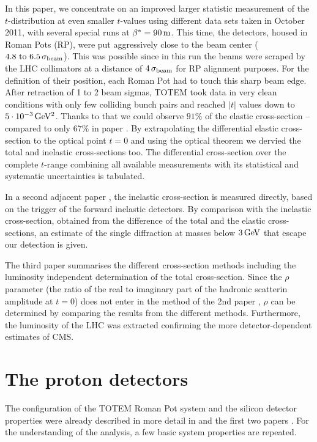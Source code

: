 \documentclass[doublecol]{../macros/epl2}
\def\un#1{\,{\rm #1}}
\begin{document}
In this paper, we concentrate on an improved larger statistic measurement of the $t$-distribution at even smaller $t$-values using different data sets taken in October 2011, with several special runs at $\beta^* = 90\un{m}$. This time, the detectors, housed in Roman Pots (RP), were put aggressively close to the beam center ($4.8 \hbox{ to } 6.5\, \sigma_{\rm beam}$). This was possible since in this run the beams were scraped by the LHC collimators at a distance of $4\,\sigma_{\rm beam}$ for RP alignment purposes. For the definition of their position, each Roman Pot had to touch this sharp beam edge. After retraction of 1 to 2 beam sigmas, TOTEM took data in very clean conditions with only few colliding bunch pairs and reached $|t|$ values down to $5\cdot10^{-3}\un{GeV^2}$. Thanks to that we could observe $91\%$ of the elastic cross-section -- compared to only $67\%$ in paper \cite{epl96}. By extrapolating the differential elastic cross-section to the optical point $t=0$ and using the optical theorem we dervied the total and inelastic cross-sections too. The differential cross-section over the complete $t$-range combining all available measurements with its statistical and systematic uncertainties is tabulated.

In a second adjacent paper \cite{P2}, the inelastic cross-section is measured directly, based on the trigger of the forward inelastic detectors. By comparison with the inelastic cross-section, obtained from the difference of the total and the elastic cross-sections, an estimate of the single diffraction at masses below $3\un{GeV}$ that escape our detection is given.

The third paper \cite{P3} summarises the different cross-section methods including the luminosity independent determination of the total cross-section. Since the $\rho$ parameter (the ratio of the real to imaginary part of the hadronic scatterin amplitude at $t=0$) does not enter in the method of the 2nd paper \cite{P2}, $\rho$ can be determined by comparing the results from the different methods. Furthermore, the luminosity of the LHC was extracted confirming the more detector-dependent estimates of CMS. 

\section{The proton detectors}

The configuration of the TOTEM Roman Pot system and the silicon detector properties were already described in more detail in \cite{jinst} and the first two papers \cite{epl95,epl96}. For the understanding of the analysis, a few basic  system  properties are repeated. 
\end{document}

